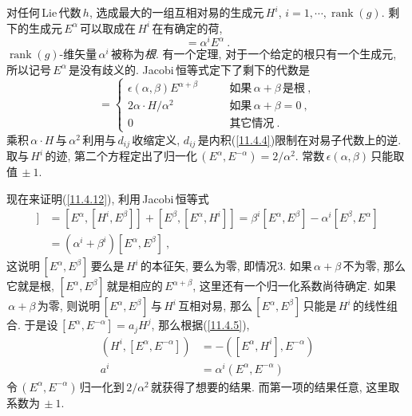 对任何\,Lie\,代数$\,h$, 选成最大的一组互相对易的生成元$\,H^{i}$, $i=1,\cdots,\operatorname{rank}(g)$. 剩下的生成元$\,E^{\alpha}\,$可以取成在$\,H^{i}\,$在有确定的荷,
\begin{equation}
    [H^{i},E^{\alpha}]=\alpha^{i}E^{\alpha} \:. \label{11.4.11}
\end{equation}
$\operatorname{rank}(g)$-维矢量$\,\alpha^{i}\,$被称为{\emph{根}}. 有一个定理, 对于一个给定的根只有一个生成元, 所以记号$\,E^{\alpha}\,$是没有歧义的. Jacobi\,恒等式定下了剩下的代数是
\begin{equation}
    [E^{\alpha},E^{\beta}] = 
    \begin{cases}
     \epsilon(\alpha,\beta) E^{\alpha+\beta} &\qquad \text{如果}\,\alpha+\beta\,\text{是根} \:, \\
     2\alpha\cdot H/\alpha^{2} &\qquad \text{如果}\,\alpha+\beta=0\:, \\
     0 &\qquad \text{其它情况} \:.
    \end{cases} \label{11.4.12}
\end{equation}
乘积$\,\alpha\cdot H\,$与$\,\alpha^{2}\,$利用与$\,d_{ij}\,$收缩定义, $d_{ij}\,$是内积(\ref{11.4.4})限制在对易子代数上的逆. 取与$\,H^{i}\,$的迹, 第二个方程定出了归一化$\,(E^{\alpha},E^{-\alpha})=2/\alpha^{2}$. 常数$\,\epsilon(\alpha,\beta)\,$只能取值$\,\pm1$.
\begin{tcolorbox}
现在来证明(\ref{11.4.12}), 利用\,Jacobi\,恒等式
\begin{align*}
    [H^{i},[E^{\alpha},E^{\beta}]] &= [E^{\alpha},[H^{i},E^{\beta}]] + [E^{\beta},[E^{\alpha},H^{i}]]
    = \beta^{i}[E^{\alpha},E^{\beta}] - \alpha^{i} [E^{\beta},E^{\alpha}] \\
    &= (\alpha^{i}+\beta^{i})[E^{\alpha},E^{\beta}] \:,
\end{align*}
这说明$\,[E^{\alpha},E^{\beta}]\,$要么是$\,H^{i}\,$的本征矢, 要么为零, 即情况3. 如果$\,\alpha+\beta\,$不为零, 那么它就是根, $[E^{\alpha},E^{\beta}]\,$就是相应的$\,E^{\alpha+\beta}$, 这里还有一个归一化系数尚待确定. 如果$\,\alpha+\beta\,$为零, 则说明$\,[E^{\alpha},E^{\beta}]\,$与$\,H^{i}\,$互相对易, 那么$\,[E^{\alpha},E^{\beta}]\,$只能是$\,H^{i}\,$的线性组合. 于是设$\,[E^{\alpha},E^{-\alpha}]= a_{j}H^{j}$, 那么根据(\ref{11.4.5}),
\begin{align*}
    (H^{i},[E^{\alpha},E^{-\alpha}])&= -([E^{\alpha},H^{i}],E^{-\alpha}) \\
        a^{i} & = \alpha^{i}(E^{\alpha},E^{-\alpha}) 
\end{align*}
令$\,(E^{\alpha},E^{-\alpha})\,$归一化到$\,2/\alpha^{2}\,$就获得了想要的结果. 而第一项的结果任意, 这里取系数为$\,\pm1$.
\end{tcolorbox}

